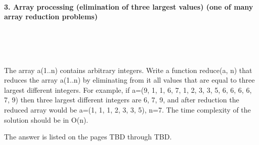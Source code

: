 \documentclass{article}
\begin{document}
	
	\rmfamily
	
	\paragraph{3. Array processing (elimination of three largest values) (one of many array reduction problems) }\
	
	\rmfamily\
	
		The array a(1..n) contains arbitrary integers. Write a function reduce(a, n) that reduces the array a(1..n) by eliminating from it all values that are equal to three largest different integers. For example, if a=(9, 1, 1, 6, 7, 1, 2, 3, 3, 5, 6, 6, 6, 6, 7, 9) then three largest different integers are 6, 7, 9, and after reduction the reduced array would be a=(1, 1, 1, 2, 3, 3, 5), n=7. The time complexity of the solution should be in O(n). 
		\newline
		
		The answer is listed on the pages TBD through TBD.
		
	\ttfamily\
	
\paragraph{}\
\paragraph{}\
\paragraph{}\
\paragraph{}\
\paragraph{}\
\paragraph{}\
\paragraph{}\
\paragraph{}\
\paragraph{}\
\end{document}
